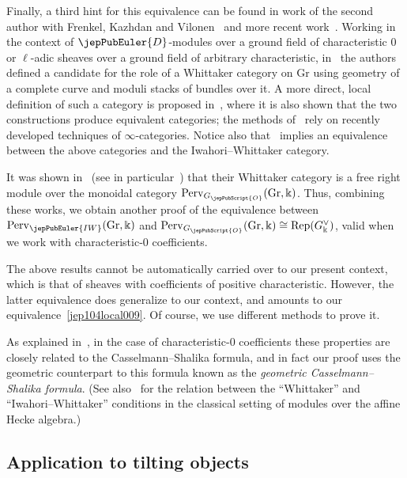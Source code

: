 Finally, a third hint for this equivalence can be found in work of the second author with Frenkel, Kazhdan and Vilonen~\cite{jep104ref25,jep104ref26} and more recent work~\cite{jep104ref28}. Working in the context of $\jepPubEuler{D}$-modules over a ground field of characteristic $0$ or $\ell$-adic sheaves over a ground field of arbitrary characteristic, in~\cite{jep104ref26} the authors defined a candidate for the role of a Whittaker category on $\mathrm{Gr}$ using geometry of a complete curve and moduli stacks of bundles over it. A more direct, local definition of such a category is proposed in~\cite{jep104ref28}, where it is also shown that the two constructions produce equivalent categories; the methods of~\cite{jep104ref28} rely on recently developed techniques of $\infty$-categories. Notice also that~\cite[Th.~2.7.1(2)]{jep104ref39} implies an equivalence between the above categories and the Iwahori--Whittaker category.

It was shown in~\cite{jep104ref26} (see in particular~\cite[\S\S 1.2.4--1.2.5]{jep104ref26}) that their Whittaker category is a free right module over the monoidal category $\mathrm{Perv}_{G_{\jepPubScript{O}}}(\mathrm{Gr},\Bbbk)$. Thus, combining these works, we obtain another proof of the equivalence between $\mathrm{Perv}_{\jepPubEuler{IW}}(\mathrm{Gr},\Bbbk)$ and $\mathrm{Perv}_{G_{\jepPubScript{O}}}(\mathrm{Gr},\Bbbk)\cong\mathrm{Rep}(G^\vee_\Bbbk)$, valid when we work with characteristic-$0$ coefficients.

The above results cannot be automatically carried over to our present context, which is that of sheaves with coefficients of positive characteristic. However, the latter equivalence does generalize to our context, and amounts to our equivalence~\eqref{jep104local009}. Of course, we use different methods to prove it.

As explained in~\cite[\S 1.1]{jep104ref26}, in the case of characteristic-$0$ coefficients these properties are closely related to the Casselmann--Shalika formula, and in fact our proof uses the geometric counterpart to this formula known as the \emph{geometric Casselmann--Shalika formula}. (See also~\cite[\S 1.1.1]{jep104ref10} for the relation between the ``Whittaker'' and ``Iwahori--Whittaker'' conditions in the classical setting of modules over the affine Hecke algebra.)

\subsection{Application to tilting objects}

